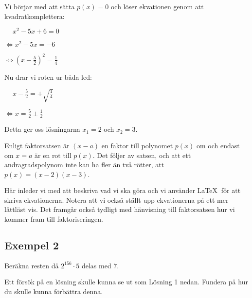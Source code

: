 \documentclass[titlepage]{article}
\begin{document}
\begin{center}
\begin{tcolorbox}[width=\linewidth,colback={green!25!white},title={\textbf{Lösning 2 - Bättre}},outer arc=0mm,colupper=black]    
    Vi börjar med att sätta $p(x)=0$ och löser ekvationen genom att kvadratkomplettera:
    \vspace{2mm}

    $\quad \: x^2-5x+6 = 0$

    $\Leftrightarrow x^2-5x = -6$

    $\Leftrightarrow(x-\frac{5}{2})^2 = \frac{1}{4}$
    \vspace{2mm}

    Nu drar vi roten ur båda led:
    \vspace{2mm}

    $\quad \: x-\frac{5}{2} = \pm \sqrt{\frac{1}{4}}$

    $\Leftrightarrow x = \frac{5}{2} \pm \frac{1}{2}$
    \vspace{2mm}

    Detta ger oss lösningarna $x_1 = 2$ och $x_2=3$.

    Enligt faktorsatsen är $(x-a)$ en faktor till polynomet $p(x)$ om och endast om $x = a$ är en rot till $p(x)$. Det följer av satsen, och att ett andragradspolynom inte kan ha fler än två rötter, att $p(x) = (x-2)(x-3)$.
\end{tcolorbox} 
\end{center}

Här inleder vi med att beskriva vad vi ska göra och vi använder \LaTeX$\:$ för att skriva ekvationerna. Notera att vi också ställt upp ekvationerna på ett mer lättläst vis. Det framgår också tydligt med hänvisning till faktorsatsen hur vi kommer fram till faktoriseringen.



\subsection*{Exempel 2}

\begin{center}
\begin{tcolorbox}[width=\linewidth,colback={white},title={\textbf{Problem}},outer arc=0mm,colupper=black]
    Beräkna resten då $2^{156}\cdot5$ delas med $7$.
\end{tcolorbox} 
\end{center}

Ett försök på en lösning skulle kunna se ut som Lösning 1 nedan. Fundera på hur du skulle kunna förbättra denna.
\end{document}
